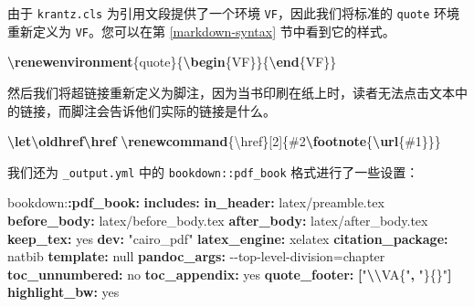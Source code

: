 \documentclass[
  12pt,
]{krantz}
\newenvironment{Shaded}{\begin{snugshade}}{\end{snugshade}}
\newcommand{\AttributeTok}[1]{\textcolor[rgb]{0.13,0.29,0.53}{#1}}
\newcommand{\CharTok}[1]{\textcolor[rgb]{0.31,0.60,0.02}{#1}}
\newcommand{\ExtensionTok}[1]{#1}
\newcommand{\FunctionTok}[1]{\textcolor[rgb]{0.13,0.29,0.53}{\textbf{#1}}}
\newcommand{\KeywordTok}[1]{\textcolor[rgb]{0.13,0.29,0.53}{\textbf{#1}}}
\newcommand{\NormalTok}[1]{#1}
\newcommand{\SpecialCharTok}[1]{\textcolor[rgb]{0.81,0.36,0.00}{\textbf{#1}}}
\newcommand{\StringTok}[1]{\textcolor[rgb]{0.31,0.60,0.02}{#1}}
\theoremstyle{definition}
\theoremstyle{definition}
\theoremstyle{definition}
\theoremstyle{definition}
\theoremstyle{remark}
\begin{document}
由于 \texttt{krantz.cls} 为引用文段提供了一个环境 \texttt{VF}，因此我们将标准的 \texttt{quote} 环境重新定义为 \texttt{VF}。您可以在第 \ref{markdown-syntax} 节中看到它的样式。

\begin{Shaded}
\begin{Highlighting}[]
\FunctionTok{\textbackslash{}renewenvironment}\NormalTok{\{quote\}\{}\KeywordTok{\textbackslash{}begin}\NormalTok{\{}\ExtensionTok{VF}\NormalTok{\}\}\{}\KeywordTok{\textbackslash{}end}\NormalTok{\{}\ExtensionTok{VF}\NormalTok{\}\}}
\end{Highlighting}
\end{Shaded}

然后我们将超链接重新定义为脚注，因为当书印刷在纸上时，读者无法点击文本中的链接，而脚注会告诉他们实际的链接是什么。

\begin{Shaded}
\begin{Highlighting}[]
\FunctionTok{\textbackslash{}let\textbackslash{}oldhref\textbackslash{}href}
\FunctionTok{\textbackslash{}renewcommand}\NormalTok{\{}\ExtensionTok{\textbackslash{}href}\NormalTok{\}[2]\{\#2}\FunctionTok{\textbackslash{}footnote}\NormalTok{\{}\FunctionTok{\textbackslash{}url}\NormalTok{\{\#1\}\}\}}
\end{Highlighting}
\end{Shaded}

我们还为 \texttt{\_output.yml} 中的 \texttt{bookdown::pdf\_book} 格式进行了一些设置：

\begin{Shaded}
\begin{Highlighting}[]
\AttributeTok{bookdown:}\FunctionTok{:pdf\_book}\KeywordTok{:}
\AttributeTok{  }\FunctionTok{includes}\KeywordTok{:}
\AttributeTok{    }\FunctionTok{in\_header}\KeywordTok{:}\AttributeTok{ latex/preamble.tex}
\AttributeTok{    }\FunctionTok{before\_body}\KeywordTok{:}\AttributeTok{ latex/before\_body.tex}
\AttributeTok{    }\FunctionTok{after\_body}\KeywordTok{:}\AttributeTok{ latex/after\_body.tex}
\AttributeTok{  }\FunctionTok{keep\_tex}\KeywordTok{:}\AttributeTok{ }\CharTok{yes}
\AttributeTok{  }\FunctionTok{dev}\KeywordTok{:}\AttributeTok{ }\StringTok{"cairo\_pdf"}
\AttributeTok{  }\FunctionTok{latex\_engine}\KeywordTok{:}\AttributeTok{ xelatex}
\AttributeTok{  }\FunctionTok{citation\_package}\KeywordTok{:}\AttributeTok{ natbib}
\AttributeTok{  }\FunctionTok{template}\KeywordTok{:}\AttributeTok{ }\CharTok{null}
\AttributeTok{  }\FunctionTok{pandoc\_args}\KeywordTok{:}\AttributeTok{ {-}{-}top{-}level{-}division=chapter}
\AttributeTok{  }\FunctionTok{toc\_unnumbered}\KeywordTok{:}\AttributeTok{ }\CharTok{no}
\AttributeTok{  }\FunctionTok{toc\_appendix}\KeywordTok{:}\AttributeTok{ }\CharTok{yes}
\AttributeTok{  }\FunctionTok{quote\_footer}\KeywordTok{:}\AttributeTok{ }\KeywordTok{[}\StringTok{"}\SpecialCharTok{\textbackslash{}\textbackslash{}}\StringTok{VA\{"}\KeywordTok{,}\AttributeTok{ }\StringTok{"\}\{\}"}\KeywordTok{]}
\AttributeTok{  }\FunctionTok{highlight\_bw}\KeywordTok{:}\AttributeTok{ }\CharTok{yes}
\end{Highlighting}
\end{Shaded}
\end{document}
